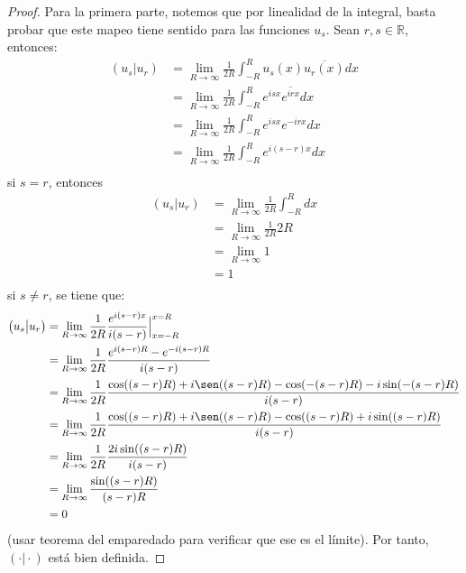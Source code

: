 \documentclass[12pt]{report}
\theoremstyle{largebreak}
\newcommand\pint[2]{\ensuremath{\left(#1\big|#2\right)}}
\newcommand\conj[1]{\ensuremath{\overline{#1}}}
\begin{document}
    \begin{proof}
        Para la primera parte, notemos que por linealidad de la integral, basta probar que este mapeo tiene sentido para las funciones $u_s$. Sean $r,s\in\mathbb{R}$, entonces:
        \begin{equation*}
            \begin{split}
                \pint{u_s}{u_r}&=\lim_{R\rightarrow\infty}\frac{1}{2R}\int_{-R}^{R}u_s(x)\conj{u_r(x)}dx \\
                &=\lim_{R\rightarrow\infty}\frac{1}{2R}\int_{-R}^{R}e^{isx}\conj{e^{irx}}dx \\
                &=\lim_{R\rightarrow\infty}\frac{1}{2R}\int_{-R}^{R}e^{isx}e^{-irx}dx \\
                &=\lim_{R\rightarrow\infty}\frac{1}{2R}\int_{-R}^{R}e^{i(s-r)x}dx \\
            \end{split}
        \end{equation*}
        si $s=r$, entonces
        \begin{equation*}
            \begin{split}
                \pint{u_s}{u_r}&=\lim_{R\rightarrow\infty}\frac{1}{2R}\int_{-R}^{R}dx \\
                &=\lim_{R\rightarrow\infty}\frac{1}{2R}2R\\
                &=\lim_{R\rightarrow\infty}1\\
                &=1\\
            \end{split}
        \end{equation*}
        si $s\neq r$, se tiene que:
        \begin{equation*}
            \begin{split}
                \pint{u_s}{u_r}&=\lim_{R\rightarrow\infty}\frac{1}{2R}\frac{e^{i(s-r)x}}{i(s-r)}\Big|_{x=-R}^{x=R } \\
                &=\lim_{R\rightarrow\infty}\frac{1}{2R}\frac{e^{i(s-r)R}-e^{-i(s-r)R}}{i(s-r)}\\
                &=\lim_{R\rightarrow\infty}\frac{1}{2R}\frac{\cos((s-r)R)+i\sen((s-r)R)-\cos(-(s-r)R)-i\sin(-(s-r)R)}{i(s-r)}\\
                &=\lim_{R\rightarrow\infty}\frac{1}{2R}\frac{\cos((s-r)R)+i\sen((s-r)R)-\cos((s-r)R)+i\sin((s-r)R)}{i(s-r)}\\
                &=\lim_{R\rightarrow\infty}\frac{1}{2R}\frac{2i\sin((s-r)R)}{i(s-r)}\\
                &=\lim_{R\rightarrow\infty}\frac{\sin((s-r)R)}{(s-r)R}\\
                &=0\\
            \end{split}
        \end{equation*}
        (usar teorema del emparedado para verificar que ese es el límite). Por tanto, $\pint{\cdot}{\cdot}$ está bien definida.


\end{proof}
\end{document}
